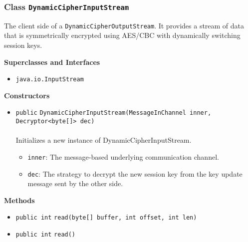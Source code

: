\subsubsection{Class \lstinline|DynamicCipherInputStream|}
The client side of a \lstinline|DynamicCipherOutputStream|. It provides a stream
 of data that is symmetrically encrypted using AES/CBC with dynamically
 switching session keys. \\
\noindent\begin{minipage}[t]{5cm}
\vspace{0.3em}
\hspace*{2em}
\vspace{0.3em}
\end{minipage}



\textbf{\sffamily Superclasses and Interfaces}
\begin{itemize}
\item \lstinline|java.io.InputStream|
\end{itemize}


\textbf{\sffamily Constructors}
\begin{itemize}
\item \lstinline|public| \lstinline|DynamicCipherInputStream|\lstinline|(MessageInChannel inner, Decryptor<byte[]> dec)|\\ \\[-0.6em]
Initializes a new instance of DynamicCipherInputStream.
\begin{itemize}
\item \lstinline|inner|: The message-based underlying communication channel.
\item \lstinline|dec|: The strategy to decrypt the new session key from the key
 update message sent by the other side.
\end{itemize}



\end{itemize}


\textbf{\sffamily Methods}
\begin{itemize}
\item \lstinline|public int| \lstinline|read|\lstinline|(byte[] buffer, int offset, int len)| \\[-0.6em]




\item \lstinline|public int| \lstinline|read|\lstinline|()| \\[-0.6em]




\end{itemize}

